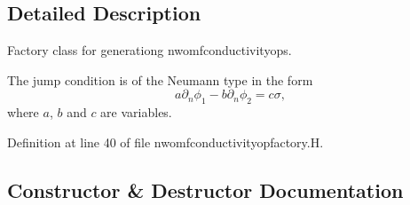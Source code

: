 \subsection{Detailed Description}
Factory class for generationg nwomfconductivityop\textquotesingle{}s. 

The jump condition is of the Neumann type in the form \[ a\partial_n\phi_1 - b\partial_n\phi_2 = c\sigma, \] where $a$, $b$ and $c$ are variables. 

Definition at line 40 of file nwomfconductivityopfactory.\+H.



\subsection{Constructor \& Destructor Documentation}
